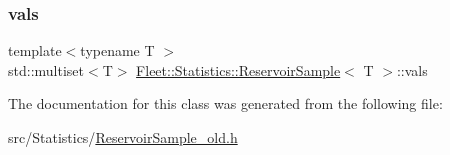 \mbox{\label{class_fleet_1_1_statistics_1_1_reservoir_sample_a9ffdb177a62651a2280099553124c433}} 
\subsubsection{\texorpdfstring{vals}{vals}}
{\footnotesize\ttfamily template$<$typename T $>$ \\
std\+::multiset$<$T$>$ \hyperlink{class_fleet_1_1_statistics_1_1_reservoir_sample}{Fleet\+::\+Statistics\+::\+Reservoir\+Sample}$<$ T $>$\+::vals}



The documentation for this class was generated from the following file\+:\begin{DoxyCompactItemize}
\item 
src/\+Statistics/\hyperlink{_reservoir_sample__old_8h}{Reservoir\+Sample\+\_\+old.\+h}\end{DoxyCompactItemize}
